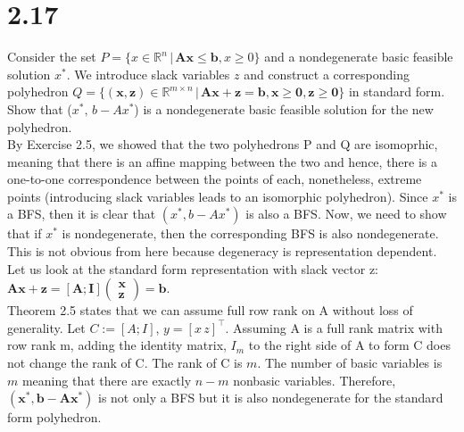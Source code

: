 \documentclass{article}
\begin{document}
\section*{2.17}
Consider the set $P = \{x \in \mathbb{R}^n \, | \, \mathbf{Ax \leq b}, x \geq 0 \}$ and a nondegenerate basic feasible solution $x^*$.  We introduce slack variables $z$ and construct a corresponding polyhedron $Q = \{\mathbf{(x,z)} \in \mathbb{R}^{m \times n} \, | \, \mathbf{Ax + z = b, x \geq 0, z \geq 0}\}$ in standard form.  Show that ($x^*, \, b-Ax^*$) is a nondegenerate basic feasible solution for the new polyhedron.\\

\noindent
By Exercise 2.5, we showed that the two polyhedrons P and Q are isomoprhic, meaning that there is an affine mapping between the two and hence, there is a one-to-one correspondence between the points of each, nonetheless, extreme points (introducing slack variables leads to an isomorphic polyhedron).  Since $x^*$ is a BFS, then it is clear that $(x^*, b-Ax^*)$ is also a BFS.  Now, we need to show that if $x^*$ is nondegenerate, then the corresponding BFS is also nondegenerate.  This is not obvious from here because degeneracy is representation dependent.\\


\noindent
Let us look at the standard form representation with slack vector z:
$\mathbf{Ax + z} = [\mathbf{A; I}] \begin{pmatrix} 
								\mathbf{x} \\ \mathbf{z}
								\end{pmatrix}
								= \mathbf{b}$.\\
Theorem 2.5 states that we can assume full row rank on A without loss of generality.  
Let $C := [A; I]$, $y = [x \, z]^\top$.  Assuming A is a full rank matrix with row rank m, adding the identity matrix, $I_m$ to the right side of A to form C does not change the rank of C.  The rank of C is $m$.  The number of basic variables is $m$ meaning that there are exactly $n-m$ nonbasic variables.  Therefore, $(\mathbf{x^*, b-Ax^*})$ is not only a BFS but it is also nondegenerate for the standard form polyhedron.\\ 
\end{document}
